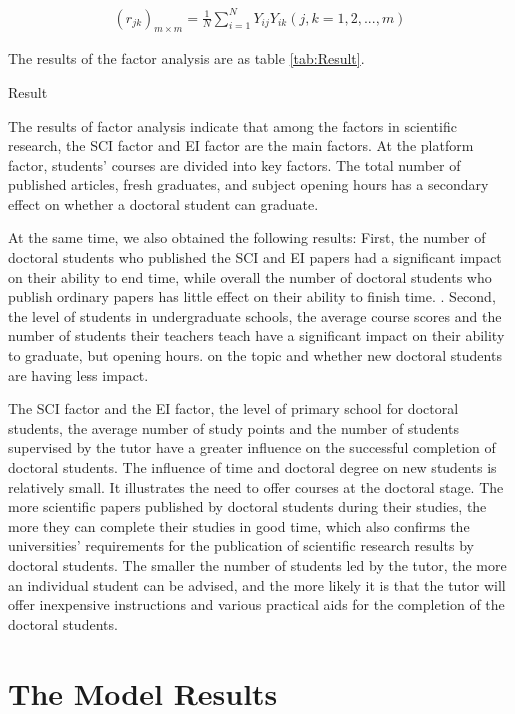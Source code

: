 \documentclass{mcmthesis}
\begin{document}
\begin{align}
	(r_{jk})_{m \times m} = \frac{1}{N}\sum_{i = 1}^N Y_{ij}Y_{ik}
	(j,k = 1, 2, ..., m)
\end{align}

The results of the factor analysis are as table \ref{tab:Result}.

\begin{table}[htbp]
	\centering
	\caption{Result}
	\label{tab:Result}
\end{table}

The results of factor analysis indicate that among the factors in scientific
research, the SCI factor and EI factor are the main factors. At the platform
factor, students' courses are divided into key factors. The total number of
published articles, fresh graduates, and subject opening hours has a secondary
effect on whether a doctoral student can graduate.

At the same time, we also obtained the following results: First, the number of
doctoral students who published the SCI and EI papers had a significant impact
on their ability to end time, while overall the number of doctoral students who
publish ordinary papers has little effect on their ability to finish time. .
Second, the level of students in undergraduate schools, the average course
scores and the number of students their teachers teach have a significant impact
on their ability to graduate, but opening hours. on the topic and whether new
doctoral students are having less impact.

The SCI factor and the EI factor, the level of primary school for doctoral
students, the average number of study points and the number of students
supervised by the tutor have a greater influence on the successful completion of
doctoral students. The influence of time and doctoral degree on new students is
relatively small. It illustrates the need to offer courses at the doctoral
stage. The more scientific papers published by doctoral students during their
studies, the more they can complete their studies in good time, which also
confirms the universities' requirements for the publication of scientific
research results by doctoral students. The smaller the number of students led by
the tutor, the more an individual student can be advised, and the more likely it
is that the tutor will offer inexpensive instructions and various practical aids
for the completion of the doctoral students.

\section{The Model Results}%
\label{sec:The Model Results}
\end{document}
